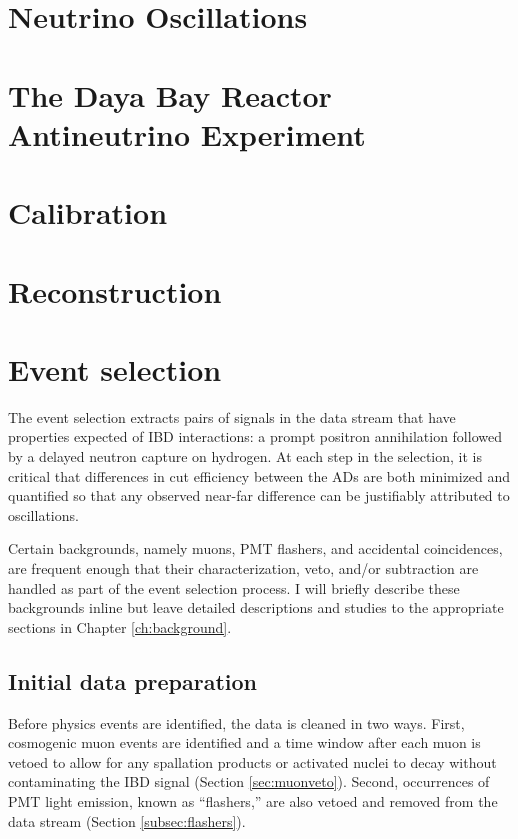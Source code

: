 \documentclass{ucbthesis}
\begin{document}
\chapter{Neutrino Oscillations}

\chapter{The Daya Bay Reactor Antineutrino Experiment}

\chapter{Calibration}

\chapter{Reconstruction}

\chapter{Event selection}

The event selection extracts pairs of signals
in the data stream that have properties expected of
IBD interactions: a prompt positron annihilation
followed by a delayed neutron capture on hydrogen.
At each step in the selection, it is critical that
differences in cut efficiency between the ADs are both
minimized and quantified so that any observed near-far difference
can be justifiably attributed to oscillations.

Certain backgrounds, namely muons, PMT flashers, and accidental coincidences,
are frequent enough that their characterization, veto, and/or subtraction
are handled as part of the event selection process.
I will briefly describe these backgrounds inline
but leave detailed descriptions and studies
to the appropriate sections in Chapter \ref{ch:background}.

\section{Initial data preparation}

Before physics events are identified,
the data is cleaned in two ways.
First, cosmogenic muon events are identified
and a time window after each muon is vetoed
to allow for any spallation products or activated nuclei to decay
without contaminating the IBD signal (Section \ref{sec:muonveto}).
Second, occurrences of PMT light emission, known as ``flashers,''
are also vetoed and removed from the data stream (Section \ref{subsec:flashers}).
\end{document}
